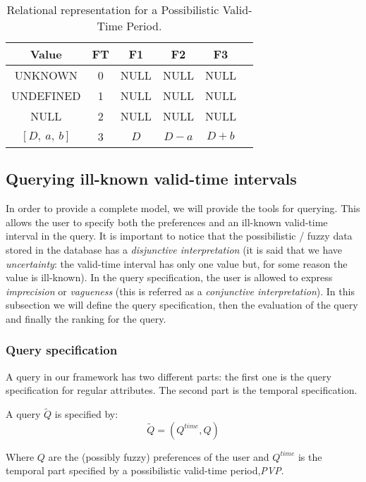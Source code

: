 \begin{table}
\caption{Relational representation for a Possibilistic Valid-Time Period.}
\centering
\begin{tabular}{c c c c c c}
\hline
Value & FT & F1 & F2 & F3  \\ \hline
UNKNOWN & 0 & NULL & NULL & NULL  \\ 
UNDEFINED & 1 & NULL & NULL & NULL  \\ 
NULL & 2 & NULL & NULL & NULL  \\ 
$\left[D,\ a,\ b \right]$ & 3 & $D$ & $D-a$ & $D+b$ \\ 
\hline
\end{tabular}
\label{table:relational-representation-pvp}
\end{table}

\subsection{Querying ill-known valid-time intervals}
In order to provide a complete model, we will provide the tools for querying. This allows the user to specify both the preferences and an ill-known valid-time interval in the query. It is important to notice that the possibilistic / fuzzy data stored in the database has a \emph{disjunctive interpretation} (it is said that we have \emph{uncertainty}: the valid-time interval has only one value but, for some reason the value is ill-known). In the query specification, the user is allowed to express \emph{imprecision} or \emph{vagueness} (this is referred as a \emph{conjunctive interpretation}).
In this subsection we will define the query specification, then the evaluation of the query and finally the ranking for the query.

\subsubsection{Query specification}
A query in our framework has two different parts: the first one is the query specification for regular attributes. The second part is the temporal specification. 

\begin{definition}
A query $\tilde Q$ is specified by:
\begin{equation}
\tilde Q = \left( Q^{time}, Q \right)
\end{equation}
\end{definition}
Where $Q$ are the (possibly fuzzy) preferences of the user  and $Q^{time}$ is the temporal part specified by a possibilistic valid-time period,\emph{PVP}.

